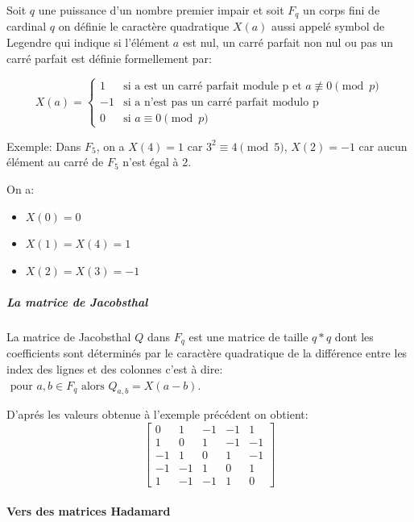 \documentclass{article}
\begin{document}
Soit $q$ une puissance d'un nombre premier impair et soit $F_q$ un corps 
fini de cardinal $q$ on définie le caractère quadratique $X(a)$ aussi 
appelé symbol de Legendre qui indique si l'élément $a$ est nul, un carré 
parfait non nul ou pas un carré parfait est définie formellement par:

\begin{equation*}
	X(a) = 
	\begin{cases}
		1 & \text{si a est un carré parfait module p et } 
		a \not\equiv 0 \pmod{p}\\
		-1 & \text{si a n'est pas un carré parfait modulo p}\\
		0 & \text{si } a \equiv 0 \pmod{p}
	\end{cases}
\end{equation*}

Exemple: Dans $F_5$, on a $X(4) = 1$ car  $3^2 \equiv 4 \pmod{5}$, 
$X(2) = -1$ car aucun élément au carré de $F_5$ n'est égal à 2.

On a:
\begin{itemize}
	\item $X(0) = 0$
	\item $X(1) = X(4) = 1$
	\item $X(2) = X(3) = -1$
\end{itemize}

\subparagraph{La matrice de Jacobsthal}

La matrice de Jacobsthal $Q$ dans $F_q$ est une matrice de taille $q*q$ 
dont les coefficients sont déterminés par le caractère quadratique de la 
différence entre les index des lignes et des colonnes c'est à dire:
$\text{ pour } a, b \in F_q \text{ alors } Q_{a,b} = X(a-b).$

D'aprés les valeurs obtenue à l'exemple précédent on obtient:
\begin{equation*}
	\begin{bmatrix}
		0 & 1 & -1 & -1 & 1\\
		1 & 0 & 1 & -1 & -1\\
		-1 & 1 & 0 & 1 & -1\\
		-1 & -1 & 1 & 0 & 1\\
		1 & -1 & -1 & 1 & 0
	\end{bmatrix}
\end{equation*}

\paragraph{Vers des matrices Hadamard}
\end{document}
